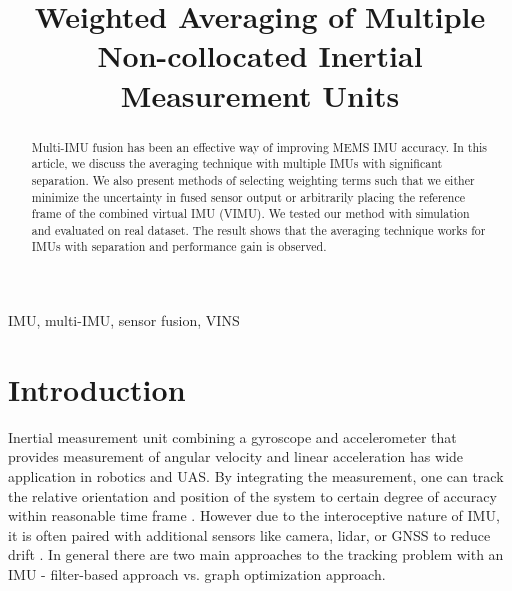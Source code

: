 \documentclass[conference]{IEEEtran}
\begin{document}
\title{Weighted Averaging of Multiple Non-collocated Inertial Measurement Units}

\author{
\and
{}
}

\maketitle

\begin{abstract}
Multi-IMU fusion has been an effective way of improving MEMS IMU accuracy. In this article, we discuss the averaging technique with multiple IMUs with significant separation. We also present methods of selecting weighting terms such that we either minimize the uncertainty in fused sensor output or arbitrarily placing the reference frame of the combined virtual IMU (VIMU). We tested our method with simulation and evaluated on real dataset. The result shows that the averaging technique works for IMUs with separation and performance gain is observed.
\end{abstract}

\begin{IEEEkeywords}
IMU, multi-IMU, sensor fusion, VINS
\end{IEEEkeywords}

\section{Introduction}

Inertial measurement unit combining a gyroscope and accelerometer that provides measurement of angular velocity and linear acceleration has wide application in robotics and UAS. By integrating the measurement, one can track the relative orientation and position of the system to certain degree of accuracy within reasonable time frame \cite{tang2022_preintegration}. However due to the interoceptive nature of IMU, it is often paired with additional sensors like camera, lidar, or GNSS to reduce drift \cite{alaba2024_gps_and_imu, shan2020_liosam, he2020_visual_imu_and_gps}. In general there are two main approaches to the tracking problem with an IMU - filter-based approach vs. graph optimization approach.
\end{document}
